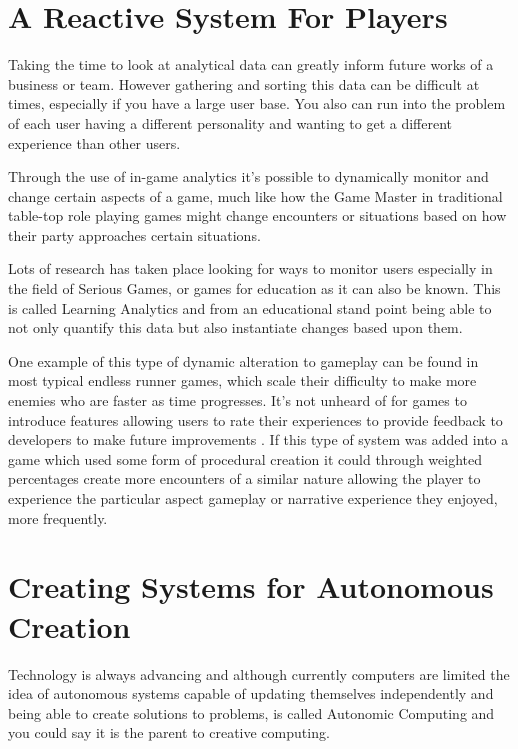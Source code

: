 \documentclass{scrartcl}
\begin{document}
\section{A Reactive System For Players}

Taking the time to look at analytical data can greatly inform future works of a business or team. However gathering and sorting this data can be difficult at times, especially if you have a large user base. You also can run into the problem of each user having a different personality and wanting to get a different experience than other users.

Through the use of in-game analytics it's possible to dynamically monitor and change certain aspects of a game, much like how the Game Master in traditional table-top role playing games might change encounters or situations based on how their party approaches certain situations. 

Lots of research has taken place looking for ways to monitor users especially in the field of Serious Games, or games for education as it can also be known. \cite{shute2009melding} \cite{hauge2014implications} This is called Learning Analytics \cite{fournier2011value} and from an educational stand point being able to not only quantify this data but also instantiate changes based upon them.

One example of this type of dynamic alteration to gameplay can be found in most typical endless runner games, which scale their difficulty to make more enemies who are faster as time progresses. It's not unheard of for games to introduce features allowing users to rate their experiences to provide feedback to developers to make future improvements \cite{ubisoft2013assassins}. If this type of system was added into a game which used some form of procedural creation it could through weighted percentages create more encounters of a similar nature allowing the player to experience the particular aspect gameplay or narrative experience they enjoyed, more frequently.

\section{Creating Systems for Autonomous Creation}

Technology is always advancing and although currently computers are limited the idea of autonomous systems capable of updating themselves independently and being able to create solutions to problems, is called Autonomic Computing \cite{viroli2016combining} \cite{capodieci2013designing} \cite{krupitzer2015towards} and you could say it is the parent to creative computing. 
\end{document}
